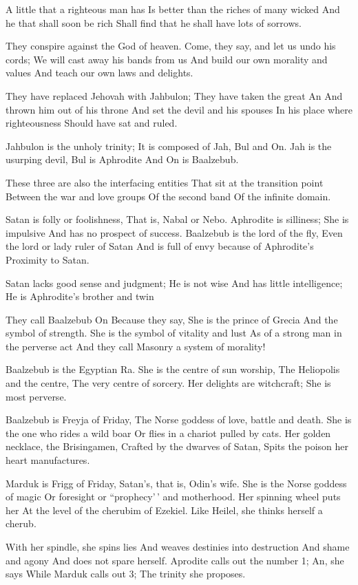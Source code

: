 \documentclass[
]{book}
\begin{document}
A little that a righteous man has
Is better than the riches of many wicked
And he that shall soon be rich
Shall find that he shall have lots of sorrows.

They conspire against the God of heaven.
Come, they say, and let us undo his cords;
We will cast away his bands from us
And build our own morality and values
And teach our own laws and delights.

They have replaced Jehovah with Jahbulon;
They have taken the great An
And thrown him out of his throne
And set the devil and his spouses
In his place where righteousness
Should have sat and ruled.

Jahbulon is the unholy trinity;
It is composed of Jah, Bul and On.
Jah is the usurping devil,
Bul is Aphrodite
And On is Baalzebub.

These three are also the interfacing entities
That sit at the transition point
Between the war and love groups
Of the second band
Of the infinite domain.

Satan is folly or foolishness,
That is, Nabal or Nebo.
Aphrodite is silliness;
She is impulsive
And has no prospect of success.
Baalzebub is the lord of the fly,
Even the lord or lady ruler of Satan
And is full of envy because of Aphrodite's
Proximity to Satan.

Satan lacks good sense and judgment;
He is not wise
And has little intelligence;
He is Aphrodite's brother and twin

They call Baalzebub On
Because they say,
She is the prince of Grecia
And the symbol of strength.
She is the symbol of vitality and lust
As of a strong man in the perverse act
And they call Masonry a system of morality!

Baalzebub is the Egyptian Ra.
She is the centre of sun worship,
The Heliopolis and the centre,
The very centre of sorcery.
Her delights are witchcraft;
She is most perverse.

Baalzebub is Freyja of Friday,
The Norse goddess of love, battle and death.
She is the one who rides a wild boar
Or flies in a chariot pulled by cats.
Her golden necklace, the Brisingamen,
Crafted by the dwarves of Satan,
Spits the poison her heart manufactures.

Marduk is Frigg of Friday,
Satan's, that is, Odin's wife.
She is the Norse goddess of magic
Or foresight or ``prophecy'\,' and motherhood.
Her spinning wheel puts her
At the level of the cherubim of Ezekiel.
Like Heilel, she thinks herself a cherub.

With her spindle, she spins lies
And weaves destinies into destruction
And shame and agony
And does not spare herself.
Aprodite calls out the number 1;
An, she says
While Marduk calls out 3;
The trinity she proposes.
\end{document}
